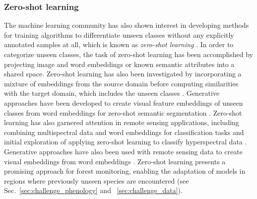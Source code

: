 \documentclass{CUP-JNL-DTM}%
\theoremstyle{definition}
\numberwithin{equation}{section}
\begin{document}
\subsubsection{Zero-shot learning}
\label{sec:ml_zeroshot}
The machine learning community has also shown interest in developing methods for training algorithms to differentiate unseen classes without any explicitly annotated samples at all, which is known as \emph{zero-shot learning} \cite{xian_zero-shot_2018}.
%
In order to categorize unseen classes, the task of zero-shot learning has been accomplished by projecting image and word embeddings \cite{socher_zero-shot_2013} or known semantic attributes \cite{lampert_attribute-based_2014} into a shared space.
%
Zero-shot learning has also been investigated by incorporating a mixture of embeddings from the source domain before computing similarities with the target domain, which includes the unseen classes \cite{zhang_zero-shot_2015}.
%
Generative approaches have been developed to create visual feature embeddings of unseen classes from word embeddings for zero-shot semantic segmentation \cite{bucher_zero-shot_2019}.
%
Zero-shot learning has also garnered attention in remote sensing applications, including
 combining multispectral data and word embeddings for classification tasks \cite{li_zero-shot_2017, li_robust_2021}
and initial exploration of applying zero-shot learning to classify hyperspectral data \cite{freitas_hyperspectral_2022}.
Generative approaches have also been used with remote sensing data to create visual embeddings from word embeddings  \cite{li_generative_2022}.
%
Zero-shot learning presents a promising approach for forest monitoring, enabling the adaptation of models in regions where previously unseen species are encountered (see Sec.~\ref{sec:challenge_phenology} and ~\ref{sec:challenge_data}).
\end{document}
